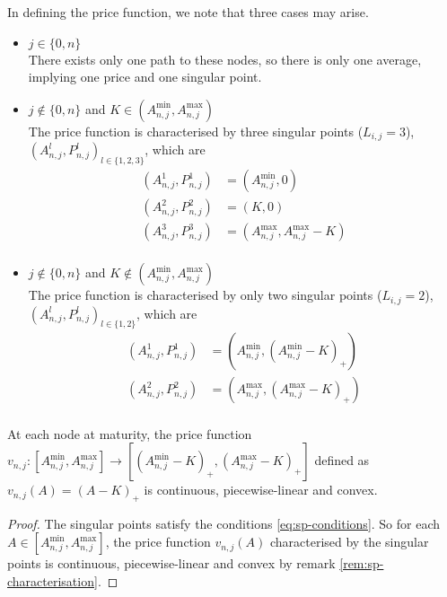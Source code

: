 In defining the price function, we note that three cases may arise.
\begin{itemize}
\item $ j \in \{ 0, n \} $ \\
	There exists only one path to these nodes, so there is only one average, implying one price and one singular point.
	
\item $ j \notin \{ 0, n \} $ and $ K \in ( A_{n,j}^{\min}, A_{n,j}^{\max} ) $ \\	
	The price function is characterised by three singular points ($ L_{i,j} = 3 $), $ ( A_{n,j}^l , P_{n,j}^l )_{l \in \{ 1, 2, 3 \} } $, which are \\
	\begin{equation} \label{eq:sp-price-maturity-kin}
		\begin{aligned}
			( A_{n,j}^1 , P_{n,j}^1 ) &= ( A_{n,j}^{\min} , 0 ) \\
			( A_{n,j}^2 , P_{n,j}^2 ) &= ( K , 0 ) \\
			( A_{n,j}^3 , P_{n,j}^3 ) &= ( A_{n,j}^{\max} , A_{n,j}^{\max} - K ) \\
		\end{aligned}
	\end{equation} \label{eq:sp-price-maturity-kout}
	
\item $ j \notin \{ 0, n \} $ and $ K \notin ( A_{n,j}^{\min}, A_{n,j}^{\max} ) $ \\
	The price function is characterised by only two singular points ($ L_{i,j} = 2 $), $ ( A_{n,j}^l , P_{n,j}^l )_{l \in \{ 1, 2 \} } $, which are \\
	\begin{equation}
		\begin{aligned}
			( A_{n,j}^1 , P_{n,j}^1 ) &= ( A_{n,j}^{\min} , ( A_{n,j}^{\min} - K )_+ ) \\
			( A_{n,j}^2 , P_{n,j}^2 ) &= ( A_{n,j}^{\max} , ( A_{n,j}^{\max} - K )_+ ) \\
		\end{aligned}
	\end{equation}
\end{itemize}

\begin{lmm}
	\label{lmm:sp-pr-maturity}
	At each node at maturity, the price function $ { v_{n,j}: \left[ A_{n,j}^{\min}, A_{n,j}^{\max} \right] \to \left[ ( A_{n,j}^{\min} - K )_+ , ( A_{n,j}^{\max} - K )_+ \right] } $ defined as $ v_{n,j}(A) = (A - K)_+ $ is continuous, piecewise-linear and convex.
\end{lmm}
\begin{proof}
	The singular points satisfy the conditions \ref{eq:sp-conditions}. So for each $ A \in \left[ A_{n,j}^{\min}, A_{n,j}^{\max} \right] $, the price function ${ v_{n,j}(A) }$ characterised by the singular points is continuous, piecewise-linear and convex by remark \ref{rem:sp-characterisation}.
\end{proof}



